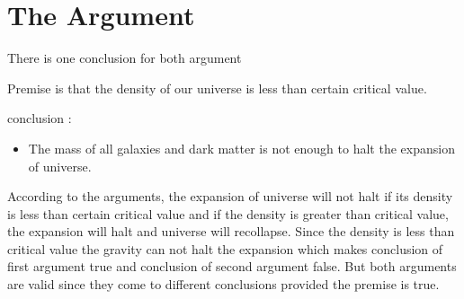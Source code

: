\documentclass{article}
\begin{document}
\section{The Argument}

There is one conclusion for both argument
 
Premise is that the density of our universe is less than certain critical value.

conclusion :
\begin{itemize}
\item The mass of all galaxies and dark matter is not enough to halt the expansion of universe.
\end{itemize}


According to the arguments, the expansion of universe will not halt if its density is less than certain critical value and if the density is greater than critical value, the expansion will halt and universe will recollapse. Since the density is less than critical value the gravity can not halt the expansion which makes conclusion of first argument true and conclusion of second argument false. But both arguments are valid since they come to different conclusions provided the premise is true. 
\end{document}
